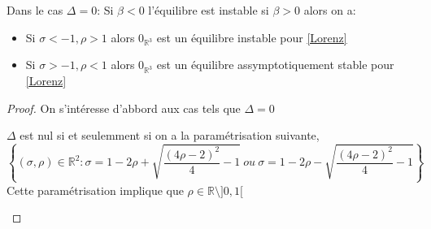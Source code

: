 \documentclass{article}
\newcommand{\R}{\mathbb{R}}
\newtheorem[M , nocut]{prop}{Proposition}[section]
\newtheorem[S , nocut]{definition}{Définition}
\newtheorem[S , nocut]{lemme}{Lemme}
\newtheorem[L , nocut]{thm}{Théoreme}
\newtheorem[L , nocut]{cor}{Corollaire}
\begin{document}
\begin{prop}\label{prop:eqDeg0}
    Dans le cas $\Delta=0$:
    Si $\beta <0$ l'équilibre est instable si $\beta>0$ alors on a:
    \begin{itemize}
        \item Si $\sigma < -1 , \rho > 1$ alors $0_{\R^3}$ est un équilibre instable pour \eqref{Lorenz}
        \item Si $\sigma > -1 , \rho < 1$ alors $0_{\R^3}$ est un équilibre assymptotiquement stable pour \eqref{Lorenz}
    \end{itemize}
\end{prop}
\begin{proof} %
    On s'intéresse d'abbord aux cas tels que $\Delta=0$

    \begin{lemme} 
        \label{lemme:Deg0}
        $\Delta$ est nul si et seulemment si on a la paramétrisation suivante,
        \[
            \left\{(\sigma,\rho)\in \R ^2 :\sigma = 1-2 \rho + \sqrt{ \frac{(4\rho-2)^2}{4} -1 }\ ou\ \sigma = 1-2 \rho - \sqrt{ \frac{(4\rho-2)^2}{4} -1 } \right\}  
        \]
        Cette paramétrisation implique que $\rho \in \R \setminus ]0,1[$
    \end{lemme}
    

\end{proof}
\end{document}
